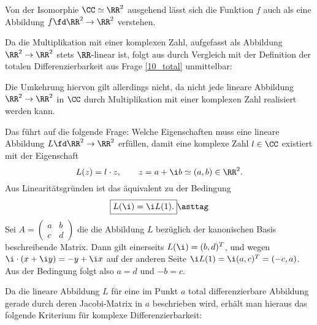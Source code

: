 \begin{antwort}
  Von der Isomorphie $\CC \simeq \RR^2$ ausgehend lässt sich 
  die Funktion $f$ auch als eine 
  Abbildung $f\fd \RR^2 \to \RR^2$ verstehen. 

  Da die Multiplikation mit einer komplexen Zahl, aufgefasst als 
  Abbildung $\RR^2\to\RR^2$ stets $\RR$-linear ist, 
  folgt aus  
  durch Vergleich mit der Definition  
   der totalen Differenzierbarkeit aus Frage 
  \ref{10_total}
  unmittelbar: 

  \medskip\noindent

  \medskip\noindent
  Die Umkehrung hiervon gilt allerdings nicht, da nicht jede 
  lineare Abbildung $\RR^2\to\RR^2$ in $\CC$ durch Multiplikation mit 
  einer komplexen Zahl realisiert werden kann. 

  Das führt auf die folgende Frage: 
  Welche Eigenschaften muss eine lineare Abbildung 
  $L \fd \RR^2 \to \RR^2$ erfüllen, damit eine 
  komplexe Zahl $l\in \CC$ existiert mit der Eigenschaft
  \[
  L(z) = l \cdot z, \qquad z=a+\i b \simeq (a,b)\in\RR^2. 
  \]
  Aus Linearitätsgründen ist das äquivalent zu der Bedingung 
  \[
  \boxed{
    L( \i )= \i L(1).
  }\asttag
  \]
  Sei $A=\left( \begin{smallmatrix} a & b \\ c & d \end{smallmatrix} \right)$ die 
  die Abbildung $L$ bezüglich der kanonischen Basis beschreibende 
  Matrix. Dann gilt einerseits $L(\i)=(b,d)^T$, und wegen 
  $\i \cdot(x+\i y)=-y+\i x$ auf der anderen Seite 
  $\i L(1)=\i (a,c)^T=(-c,a)$. Aus der Bedingung {\astref} folgt also 
  $a=d$ und $-b=c$.

  Da die lineare Abbildung $L$ für eine im Punkt $a$ total 
  differenzierbare Abbildung gerade durch deren  
  Jacobi-Matrix in $a$ beschrieben wird, erhält man hieraus das 
  folgende Kriterium für komplexe Differenzierbarkeit:

  \medskip
  \noindent{}
\end{antwort} 

